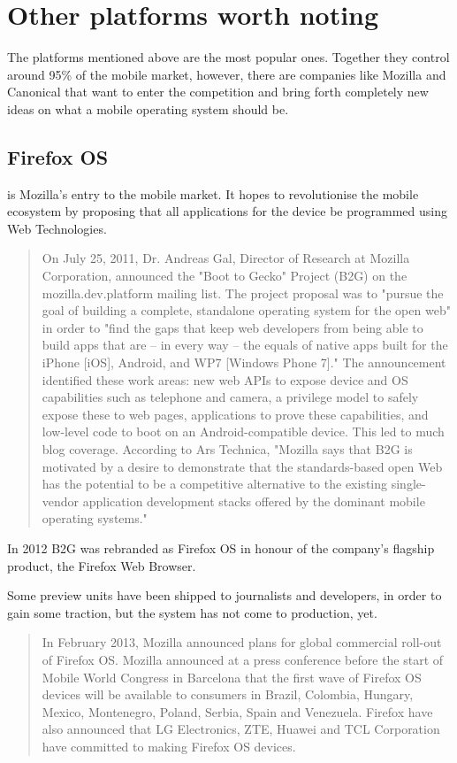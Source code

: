 \section{Other platforms worth noting}
The platforms mentioned above are the most popular ones. Together they control around 95\% of the mobile market, however, there are companies like Mozilla and Canonical that want to enter the competition and bring forth completely new ideas on what a mobile operating system should be.

\subsection{Firefox OS}
 is Mozilla's entry to the mobile market. It hopes to revolutionise the mobile ecosystem by proposing that all applications for the device be programmed using Web Technologies.

\begin{quotation}
On July 25, 2011, Dr. Andreas Gal, Director of Research at Mozilla Corporation, announced the "Boot to Gecko" Project (B2G) on the mozilla.dev.platform mailing list. The project proposal was to "pursue the goal of building a complete, standalone operating system for the open web" in order to "find the gaps that keep web developers from being able to build apps that are – in every way – the equals of native apps built for the iPhone [iOS], Android, and WP7 [Windows Phone 7]." The announcement identified these work areas: new web APIs to expose device and OS capabilities such as telephone and camera, a privilege model to safely expose these to web pages, applications to prove these capabilities, and low-level code to boot on an Android-compatible device.
This led to much blog coverage. According to Ars Technica, "Mozilla says that B2G is motivated by a desire to demonstrate that the standards-based open Web has the potential to be a competitive alternative to the existing single-vendor application development stacks offered by the dominant mobile operating systems."
\cite{wikipedia:firefox}
\end{quotation}

In 2012 B2G was rebranded as Firefox OS in honour of the company's flagship product, the Firefox Web Browser.


Some preview units have been shipped to journalists and developers, in order to gain some traction, but the system has not come to production, yet. 

\begin{quotation}
In February 2013, Mozilla announced plans for global commercial roll-out of Firefox OS. Mozilla announced at a press conference before the start of Mobile World Congress in Barcelona that the first wave of Firefox OS devices will be available to consumers in Brazil, Colombia, Hungary, Mexico, Montenegro, Poland, Serbia, Spain and Venezuela. Firefox have also announced that LG Electronics, ZTE, Huawei and TCL Corporation have committed to making Firefox OS devices.
\cite{wikipedia:firefox}
\end{quotation}

